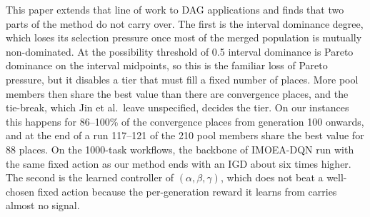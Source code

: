 This paper extends that line of work to DAG applications and finds that two parts of the method do not carry over. The
first is the interval dominance degree, which loses its selection pressure once most of the merged population is
mutually non-dominated. At the possibility threshold of 0.5 interval dominance is Pareto dominance on the interval
midpoints, so this is the familiar loss of Pareto pressure, but it disables a tier that must fill a fixed number of
places. More pool members then share the best value than there are convergence places, and the tie-break, which Jin et
al.\ leave unspecified, decides the tier. On our instances this happens for 86--100\% of the convergence places from
generation 100 onwards, and at the end of a run 117--121 of the 210 pool members share the best value for 88 places. On
the 1000-task workflows, the backbone of IMOEA-DQN run with the same fixed action as our method ends with an IGD about
six times higher. The second is the learned controller of $(\alpha, \beta, \gamma)$, which does not beat a well-chosen
fixed action because the per-generation reward it learns from carries almost no signal.

